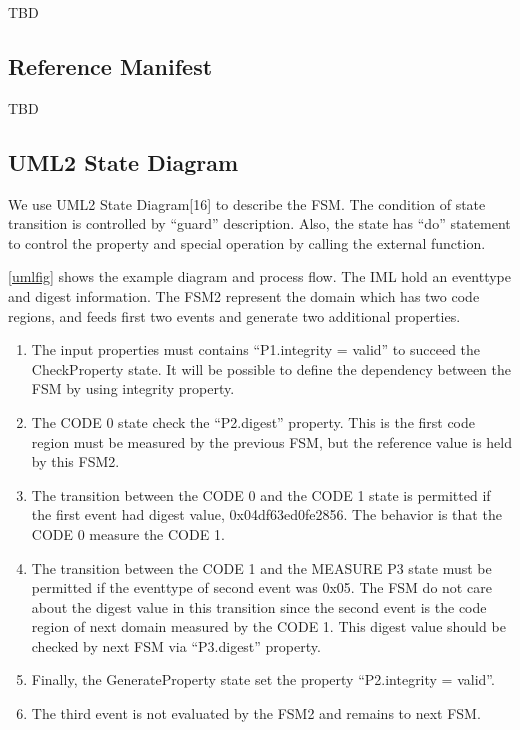 \documentclass[12pt,a4paper]{article}
\begin{document}
TBD


\subsection{Reference Manifest}


TBD


\subsection{UML2 State Diagram}

We use UML2 State Diagram[16] to describe the FSM. The condition of state transition is controlled
by “guard” description. Also, the state has “do” statement to control the property and special
operation by calling the external function.

\ref{umlfig} shows the example diagram and process flow. The IML hold an eventtype and digest
information. The FSM2 represent the domain which has two code regions, and feeds first two events
and generate two additional properties.

\begin{enumerate}
   \item The input properties must contains “P1.integrity = valid” to succeed the CheckProperty state.
       It will be possible to define the dependency between the FSM by using integrity property.
   \item The CODE 0 state check the “P2.digest” property. This is the first code region must be
       measured by the previous FSM, but the reference value is held by this FSM2.
   \item The transition between the CODE 0 and the CODE 1 state is permitted if the first event had
       digest value, 0x04df63ed0fe2856. The behavior is that the CODE 0 measure the CODE 1.
   \item The transition between the CODE 1 and the MEASURE P3 state must be permitted if the
       eventtype of second event was 0x05. The FSM do not care about the digest value in this
       transition since the second event is the code region of next domain measured by the CODE 1.
       This digest value should be checked by next FSM via “P3.digest” property.
   \item Finally, the GenerateProperty state set the property “P2.integrity = valid”.
   \item The third event is not evaluated by the FSM2 and remains to next FSM.
\end{enumerate}
\end{document}
